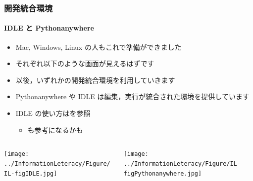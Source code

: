 \begin{frame}
\frametitle{開発統合環境}
\framesubtitle{IDLE と Pythonanywhere}
  \begin{itemize}
\item Mac, Windows, Linux の人もこれで準備ができました
\item それぞれ以下のような画面が見えるはずです
\item 以後，いずれかの開発統合環境を利用していきます
\item Pythonanywhere や IDLE は編集，実行が統合された環境を提供しています
\item IDLE の使い方は\href{https://docs.python.org/ja/3/library/idle.html?highlight=idle}{}を参照
    \begin{itemize}
\item \href{http://www.isc.meiji.ac.jp/~mizutani/python/intro1_python.html}{}も参考になるかも
    \end{itemize}
  \end{itemize}
  \begin{columns}[c]
    \begin{column}{5cm}
\texttt{[image: ../InformationLeteracy/Figure/IL-figIDLE.jpg]}
    \end{column}
    \begin{column}{5cm}
\texttt{[image: ../InformationLeteracy/Figure/IL-figPythonanywhere.jpg]}
    \end{column}
  \end{columns}
\end{frame}
